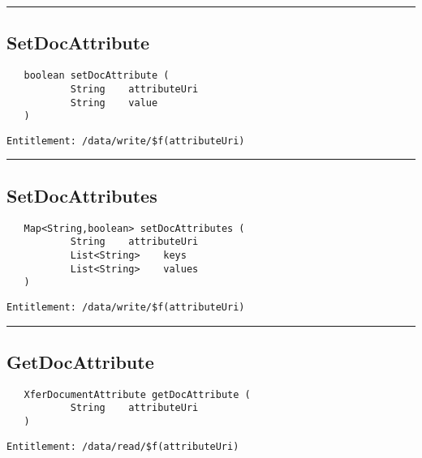 \rule{12cm}{2pt}
\subsection{SetDocAttribute}
\label{Api:SetDocAttribute}
\begin{verbatim}
   boolean setDocAttribute (
           String    attributeUri
           String    value
   )
\end{verbatim}
\begin{Verbatim}[fontsize=\small, formatcom=\color{Maroon}]
  Entitlement: /data/write/$f(attributeUri)
\end{Verbatim}



\rule{12cm}{2pt}
\subsection{SetDocAttributes}
\label{Api:SetDocAttributes}
\begin{verbatim}
   Map<String,boolean> setDocAttributes (
           String    attributeUri
           List<String>    keys
           List<String>    values
   )
\end{verbatim}
\begin{Verbatim}[fontsize=\small, formatcom=\color{Maroon}]
  Entitlement: /data/write/$f(attributeUri)
\end{Verbatim}



\rule{12cm}{2pt}
\subsection{GetDocAttribute}
\label{Api:GetDocAttribute}
\begin{verbatim}
   XferDocumentAttribute getDocAttribute (
           String    attributeUri
   )
\end{verbatim}
\begin{Verbatim}[fontsize=\small, formatcom=\color{Maroon}]
  Entitlement: /data/read/$f(attributeUri)
\end{Verbatim}



